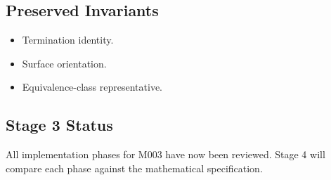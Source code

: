 \subsection{Preserved Invariants}

\begin{itemize}
\item Termination identity.
\item Surface orientation.
\item Equivalence-class representative.
\end{itemize}

\subsection{Stage 3 Status}

All implementation phases for M003 have now been reviewed. Stage 4 will
compare each phase against the mathematical specification.
